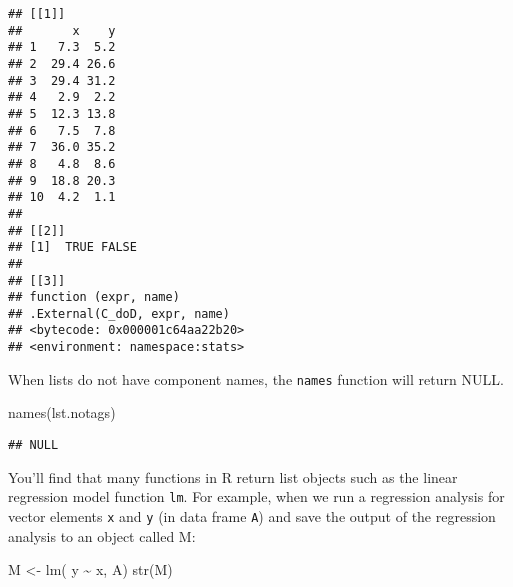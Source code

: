 \documentclass[
]{article}
\newenvironment{Shaded}{\begin{snugshade}}{\end{snugshade}}
\newcommand{\FunctionTok}[1]{\textcolor[rgb]{0.00,0.00,0.00}{#1}}
\newcommand{\NormalTok}[1]{#1}
\newcommand{\OtherTok}[1]{\textcolor[rgb]{0.56,0.35,0.01}{#1}}
\newcommand{\SpecialCharTok}[1]{\textcolor[rgb]{0.00,0.00,0.00}{#1}}
\begin{document}
\begin{verbatim}
## [[1]]
##       x    y
## 1   7.3  5.2
## 2  29.4 26.6
## 3  29.4 31.2
## 4   2.9  2.2
## 5  12.3 13.8
## 6   7.5  7.8
## 7  36.0 35.2
## 8   4.8  8.6
## 9  18.8 20.3
## 10  4.2  1.1
## 
## [[2]]
## [1]  TRUE FALSE
## 
## [[3]]
## function (expr, name) 
## .External(C_doD, expr, name)
## <bytecode: 0x000001c64aa22b20>
## <environment: namespace:stats>
\end{verbatim}

When lists do not have component names, the \texttt{names} function will
return NULL.

\begin{Shaded}
\begin{Highlighting}[]
\FunctionTok{names}\NormalTok{(lst.notags)}
\end{Highlighting}
\end{Shaded}

\begin{verbatim}
## NULL
\end{verbatim}

You'll find that many functions in R return list objects such as the
linear regression model function \texttt{lm}. For example, when we run a
regression analysis for vector elements \texttt{x} and \texttt{y} (in
data frame \texttt{A}) and save the output of the regression analysis to
an object called M:

\begin{Shaded}
\begin{Highlighting}[]
\NormalTok{M }\OtherTok{\textless{}{-}} \FunctionTok{lm}\NormalTok{( y }\SpecialCharTok{\textasciitilde{}}\NormalTok{ x, A)}
\FunctionTok{str}\NormalTok{(M)}
\end{Highlighting}
\end{Shaded}
\end{document}
